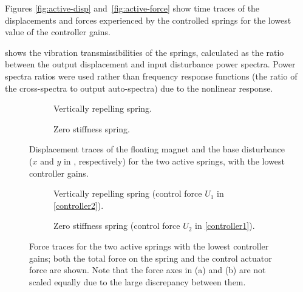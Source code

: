 Figures \ref{fig:active-disp} and~\ref{fig:active-force}
show time traces of the displacements and forces experienced by the
controlled springs for the lowest value of the controller gains.

 shows the vibration transmissibilities of the
springs, calculated as the ratio between the output displacement and
input disturbance power spectra. Power spectra ratios were used
rather than frequency response functions (the ratio of the
cross-spectra to output auto-spectra) due to the nonlinear
response.

\begin{figure}
\begin{wide}
  \begin{subfigure}
    \caption{Vertically repelling spring.}
  \end{subfigure}
  \hfill
  \begin{subfigure}
    \caption{Zero stiffness spring.}  
     \end{subfigure}
  \end{wide}
  \caption{Displacement traces of the floating magnet and the base
      disturbance ($x$ and $y$ in ,
      respectively) for the two active springs, with the lowest
      controller gains.}
\end{figure}

\begin{figure}
\begin{wide}
  \begin{subfigure}
    \caption{Vertically repelling spring (control 
     force $U_1$ in \eqref{controller2}).}  
  \end{subfigure}
  \hfill
  \begin{subfigure}
    \caption{Zero stiffness spring (control force 
     $U_2$ in \eqref{controller1}).}    
  \end{subfigure}
  \end{wide}
  \caption{Force traces for the two active springs with the lowest
    controller gains; both the total force on the spring and the
    control actuator force are shown.  Note that the force axes in (a)
    and (b) are not scaled equally due to the large discrepancy
    between them.}
\end{figure}

